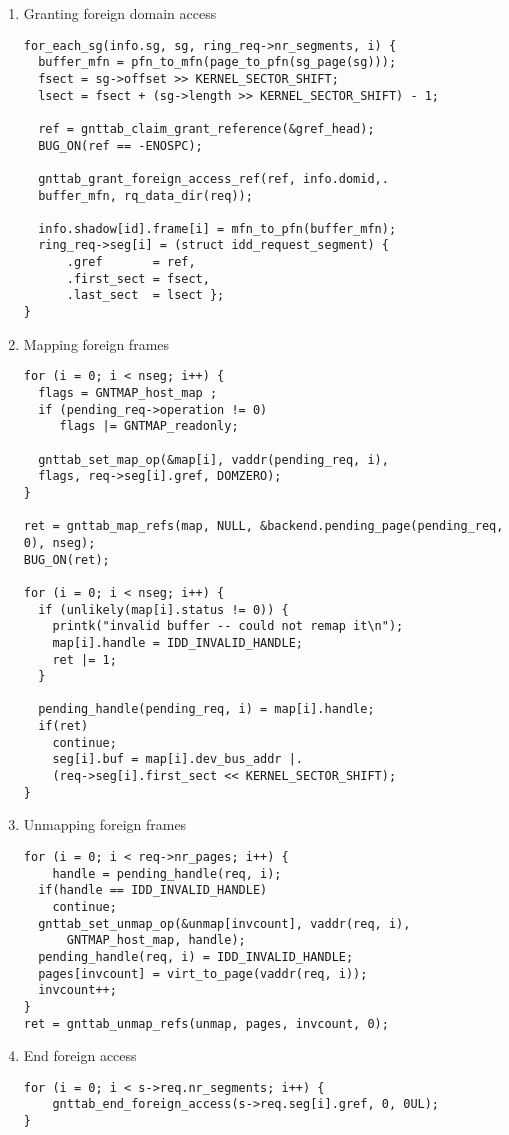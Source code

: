 \begin{enumerate}
\item Granting foreign domain access
\begin{verbatim}
for_each_sg(info.sg, sg, ring_req->nr_segments, i) {
  buffer_mfn = pfn_to_mfn(page_to_pfn(sg_page(sg)));
  fsect = sg->offset >> KERNEL_SECTOR_SHIFT;
  lsect = fsect + (sg->length >> KERNEL_SECTOR_SHIFT) - 1;
   
  ref = gnttab_claim_grant_reference(&gref_head);
  BUG_ON(ref == -ENOSPC);
    
  gnttab_grant_foreign_access_ref(ref, info.domid,.
  buffer_mfn, rq_data_dir(req));

  info.shadow[id].frame[i] = mfn_to_pfn(buffer_mfn);
  ring_req->seg[i] = (struct idd_request_segment) {
      .gref       = ref,
      .first_sect = fsect,
      .last_sect  = lsect };
}
\end{verbatim}

\item Mapping foreign frames
\begin{verbatim}
for (i = 0; i < nseg; i++) { 
  flags = GNTMAP_host_map ;
  if (pending_req->operation != 0)
     flags |= GNTMAP_readonly;

  gnttab_set_map_op(&map[i], vaddr(pending_req, i),
  flags, req->seg[i].gref, DOMZERO);
}

ret = gnttab_map_refs(map, NULL, &backend.pending_page(pending_req, 0), nseg);
BUG_ON(ret);
 
for (i = 0; i < nseg; i++) {
  if (unlikely(map[i].status != 0)) {
    printk("invalid buffer -- could not remap it\n");
    map[i].handle = IDD_INVALID_HANDLE;
    ret |= 1;
  }

  pending_handle(pending_req, i) = map[i].handle;
  if(ret)
    continue; 
	seg[i].buf = map[i].dev_bus_addr |.
	(req->seg[i].first_sect << KERNEL_SECTOR_SHIFT);
}
\end{verbatim}

\item Unmapping foreign frames
\begin{verbatim}
for (i = 0; i < req->nr_pages; i++) {
	handle = pending_handle(req, i); 
  if(handle == IDD_INVALID_HANDLE)
    continue;
  gnttab_set_unmap_op(&unmap[invcount], vaddr(req, i), 
      GNTMAP_host_map, handle);
  pending_handle(req, i) = IDD_INVALID_HANDLE;
  pages[invcount] = virt_to_page(vaddr(req, i));
  invcount++;
}  
ret = gnttab_unmap_refs(unmap, pages, invcount, 0); 
\end{verbatim}

\item End foreign access
\begin{verbatim}
for (i = 0; i < s->req.nr_segments; i++) {
	gnttab_end_foreign_access(s->req.seg[i].gref, 0, 0UL);
}
\end{verbatim}
\end{enumerate}

